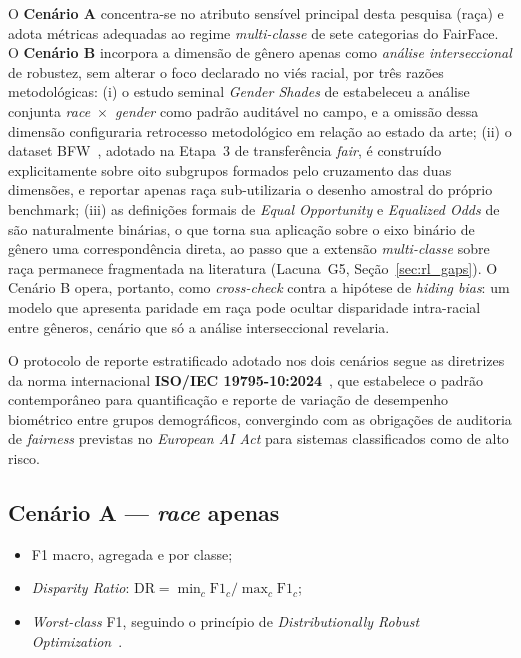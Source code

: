 O \textbf{Cenário A} concentra-se no atributo sensível principal desta pesquisa (raça) e adota métricas adequadas ao regime \emph{multi-classe} de sete categorias do FairFace. O \textbf{Cenário B} incorpora a dimensão de gênero apenas como \emph{análise interseccional} de robustez, sem alterar o foco declarado no viés racial, por três razões metodológicas: (i) o estudo seminal \emph{Gender Shades} de  estabeleceu a análise conjunta \emph{race}~$\times$~\emph{gender} como padrão auditável no campo, e a omissão dessa dimensão configuraria retrocesso metodológico em relação ao estado da arte; (ii) o dataset BFW~\cite{robinson2020face}, adotado na Etapa~3 de transferência \emph{fair}, é construído explicitamente sobre oito subgrupos formados pelo cruzamento das duas dimensões, e reportar apenas raça sub-utilizaria o desenho amostral do próprio benchmark; (iii) as definições formais de \emph{Equal Opportunity} e \emph{Equalized Odds} de  são naturalmente binárias, o que torna sua aplicação sobre o eixo binário de gênero uma correspondência direta, ao passo que a extensão \emph{multi-classe} sobre raça permanece fragmentada na literatura (Lacuna~G5, Seção~\ref{sec:rl_gaps}). O Cenário B opera, portanto, como \emph{cross-check} contra a hipótese de \emph{hiding bias}: um modelo que apresenta paridade em raça pode ocultar disparidade intra-racial entre gêneros, cenário que só a análise interseccional revelaria.

O protocolo de reporte estratificado adotado nos dois cenários segue as diretrizes da norma internacional \textbf{ISO/IEC 19795-10:2024}~\cite{iso2024biometric}, que estabelece o padrão contemporâneo para quantificação e reporte de variação de desempenho biométrico entre grupos demográficos, convergindo com as obrigações de auditoria de \emph{fairness} previstas no \emph{European AI Act} para sistemas classificados como de alto risco.

\subsection{Cenário A --- \emph{race} apenas}
\begin{itemize}
\item F1 macro, agregada e por classe;
\item \emph{Disparity Ratio}: $\mathrm{DR} = \min_c \mathrm{F1}_c / \max_c \mathrm{F1}_c$;
\item \emph{Worst-class} F1, seguindo o princípio de \emph{Distributionally Robust Optimization}~\cite{sagawa2020distribution}.
\end{itemize}

